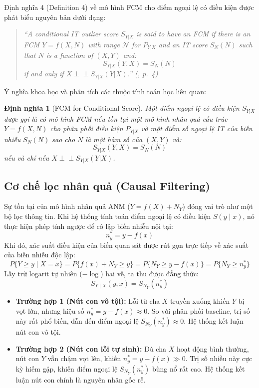 \documentclass[11pt,a4paper]{article}
\newtheorem{definition}{Định nghĩa}
\begin{document}
Định nghĩa 4 (Definition 4) về mô hình FCM cho điểm ngoại lệ có điều kiện được phát biểu nguyên bản dưới dạng:
\begin{quote}
\itshape
``A conditional IT outlier score $S_{Y|X}$ is said to have an FCM if there is an FCM $Y = f(X,N)$ with range $\mathcal{N}$ for $P_{Y|X}$ and an IT score $S_N(N)$ such that $N$ is a function of $(X,Y)$ and:
\begin{equation*}
S_{Y|X}(Y,X) = S_N(N)
\end{equation*}
if and only if $X \perp \!\!\! \perp S_{Y|X}(Y|X)$.'' (\cite{janzing2019rootcause}, p.~4)
\end{quote}

Ý nghĩa khoa học và phân tích các thuộc tính toán học liên quan:
\begin{definition}[FCM for Conditional Score]
Một điểm ngoại lệ có điều kiện $S_{Y|X}$ được gọi là có mô hình FCM nếu tồn tại một mô hình nhân quả cấu trúc $Y = f(X, N)$ cho phân phối điều kiện $P_{Y|X}$ và một điểm số ngoại lệ IT của biến nhiễu $S_N(N)$ sao cho $N$ là một hàm số của $(X, Y)$ và:
\begin{equation}
S_{Y|X}(Y, X) = S_N(N)
\end{equation}
nếu và chỉ nếu $X \perp \!\!\! \perp S_{Y|X}(Y|X)$.
\end{definition}

\subsection{Cơ chế lọc nhân quả (Causal Filtering)}

Sự tồn tại của mô hình nhân quả ANM ($Y = f(X) + N_Y$) đóng vai trò như một bộ lọc thông tin. Khi hệ thống tính toán điểm ngoại lệ có điều kiện $S(y \mid x)$, nó thực hiện phép tính ngược để cô lập biến nhiễu nội tại:
\begin{equation}
n_y^* = y - f(x)
\end{equation}
Khi đó, xác suất điều kiện của biến quan sát được rút gọn trực tiếp về xác suất của biến nhiễu độc lập:
\begin{equation}
P\{Y \ge y \mid X = x\} = P\{f(x) + N_Y \ge y\} = P\{N_Y \ge y - f(x)\} = P\{N_Y \ge n_y^*\}
\end{equation}
Lấy trừ logarit tự nhiên ($-\log$) hai vế, ta thu được đẳng thức:
\begin{equation}
S_{Y \mid X}(y, x) = S_{N_Y}(n_y^*)
\end{equation}

\begin{itemize}
    \item \textbf{Trường hợp 1 (Nút con vô tội):} Lỗi từ cha $X$ truyền xuống khiến $Y$ bị vọt lớn, nhưng hiệu số $n_y^* = y - f(x) \approx 0$. So với phân phối baseline, trị số này rất phổ biến, dẫn đến điểm ngoại lệ $S_{N_Y}(n_y^*) \approx 0$. Hệ thống kết luận nút con vô tội.
    \item \textbf{Trường hợp 2 (Nút con lỗi tự sinh):} Dù cha $X$ hoạt động bình thường, nút con $Y$ vẫn chậm vọt lên, khiến $n_y^* = y - f(x) \gg 0$. Trị số nhiễu này cực kỳ hiếm gặp, khiến điểm ngoại lệ $S_{N_Y}(n_y^*)$ bùng nổ rất cao. Hệ thống kết luận nút con chính là nguyên nhân gốc rễ.
\end{itemize}
\end{document}
